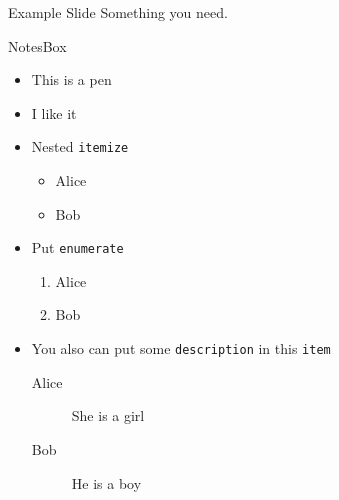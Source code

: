 \documentclass{beamer}
\newenvironment{notes}
  {%
    \begin{xlrbox}{NotesBox}
    \begin{minipage}{\textwidth}
    \begin{itemize}
    \setlength{\itemindent}{0em}
  }{%
    \end{itemize}
    \end{minipage}
    \end{xlrbox}
    \note{\theNotesBox}}
\begin{document}
\begin{frame}{Example Slide}
  Something you need.

  \begin{notes}
    \item This is a pen
    
    \item I like it
    
    \item Nested \texttt{itemize}
    \begin{itemize}
        \item Alice
        \item Bob
    \end{itemize}
    
    \item Put \texttt{enumerate}
    \begin{enumerate}
        \item Alice
        \item Bob
    \end{enumerate}

    \item You also can put some \texttt{description} in this \texttt{item}
    \begin{description}
      \item[Alice] She is a girl
      \item[Bob] He is a boy
    \end{description}
  \end{notes}
\end{frame}
\end{document}
